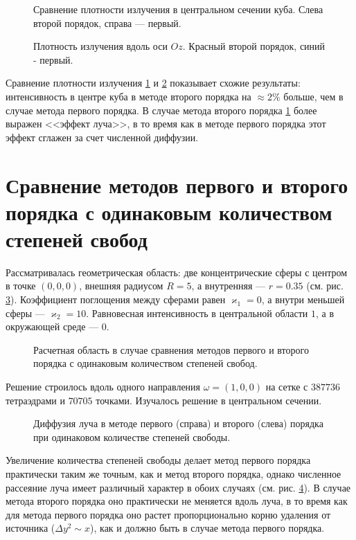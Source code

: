 \begin{figure}[ht!]
\caption{Сравнение плотности излучения в центральном сечении куба. Слева второй порядок, справа --- первый.}
\label{fig:9}
\end{figure}

\begin{figure}[ht!]
\caption{Плотность излучения вдоль оси $Oz$. Красный второй порядок, синий - первый.}
\label{fig:10}
\end{figure}
Сравнение плотности излучения \ref{fig:9} и \ref{fig:10} показывает схожие результаты: интенсивность в центре куба в методе второго порядка на $\approx 2 \%$ больше, чем в случае метода первого порядка. В случае метода второго порядка \ref{fig:9} более выражен <<эффект луча>>, в то время как в методе первого порядка этот эффект сглажен за счет численной диффузии. 

\section{Сравнение методов первого и второго порядка с одинаковым количеством степеней свобод}
Рассматривалась геометрическая область: две концентрические сферы  с центром в точке $(0,0,0)$, внешняя радиусом $R = 5$, а внутренняя --- $r = 0.35$ (см. рис. \ref{fig:11}). Коэффициент поглощения между  сферами равен $\varkappa_1 = 0$, а внутри меньшей сферы --- $\varkappa_2 = 10$. Равновесная интенсивность в центральной области $1$, а в окружающей среде --- $0$. 
\begin{figure}[ht!]
\caption{Расчетная область в случае сравнения методов первого и второго порядка с одинаковым количеством степеней свобод.}
\label{fig:11}
\end{figure}
Решение строилось вдоль одного направления $\omega = (1, 0, 0)$ на сетке с $387736$ тетраэдрами и $70705$ точками. Изучалось решение в центральном сечении. 
\begin{figure}[ht!]
\caption{Диффузия луча в методе первого (справа) и второго (слева) порядка при одинаковом количестве степеней свободы.}
\label{fig:12}
\end{figure}

Увеличение количества степеней свободы делает метод первого порядка практически таким же точным, как и метод второго порядка, однако численное рассеяние луча имеет различный характер в обоих случаях (см. рис. \ref{fig:12}). В случае метода второго порядка оно практически не меняется вдоль луча, в то время как для метода первого порядка оно растет пропорционально корню удаления от источника ($\Delta y^2 \sim x$), как и должно быть в случае метода первого порядка. 
